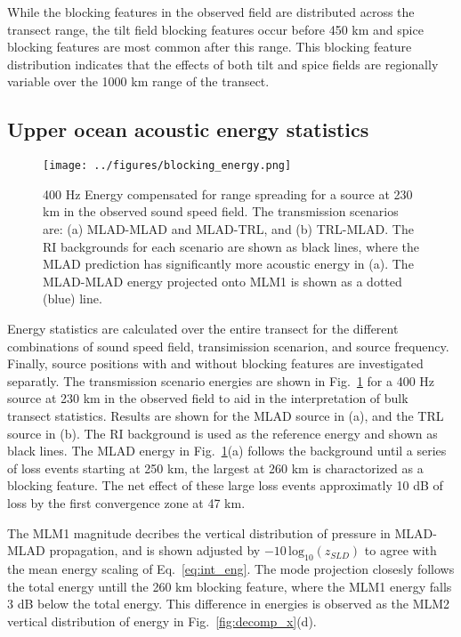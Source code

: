 \documentclass[preprint,NumberedRefs]{JASA}
\begin{document}
While the blocking features in the observed field are distributed across the transect range, the tilt field blocking features occur before 450 km and spice blocking features are most common after this range. This blocking feature distribution indicates that the effects of both tilt and spice fields are regionally variable over the 1000 km range of the transect.

\subsection{Upper ocean acoustic energy statistics}\label{ssec:energy}
\begin{figure}
\texttt{[image: ../figures/blocking\_energy.png]}
    \caption{400 Hz Energy compensated for range spreading for a source at 230 km in the observed sound speed field. The transmission scenarios are: (a) MLAD-MLAD and MLAD-TRL, and (b) TRL-MLAD. The RI backgrounds for each scenario are shown as black lines, where the MLAD prediction has significantly more acoustic energy in (a). The MLAD-MLAD energy projected onto MLM1 is shown as a dotted (blue) line.}
    \label{fig:ml_energy}
\end{figure}
Energy statistics are calculated over the entire transect for the different combinations of sound speed field, transimission scenarion, and source frequency. Finally, source positions with and without blocking features are investigated separatly. The transmission scenario energies are shown in Fig.~\ref{fig:ml_energy} for a 400 Hz source at 230 km in the observed field to aid in the interpretation of bulk transect statistics. Results are shown for the MLAD source in (a), and the TRL source in (b). The RI background is used as the reference energy and shown as black lines. The MLAD energy in Fig.~\ref{fig:ml_energy}(a) follows the background until a series of loss events starting at 250 km, the largest at 260 km is charactorized as a blocking feature. The net effect of these large loss events approximatly 10 dB of loss by the first convergence zone at 47 km.

The MLM1 magnitude decribes the vertical distribution of pressure in MLAD-MLAD propagation, and is shown adjusted by $-10 \, \textrm{log}_{10}(z_{SLD})$ to agree with the mean energy scaling of Eq.~\eqref{eq:int_eng}. The mode projection closesly follows the total energy untill the 260 km blocking feature, where the MLM1 energy falls 3 dB below the total energy. This difference in energies is observed as the MLM2 vertical distribution of energy in Fig.~\ref{fig:decomp_x}(d).
\end{document}

